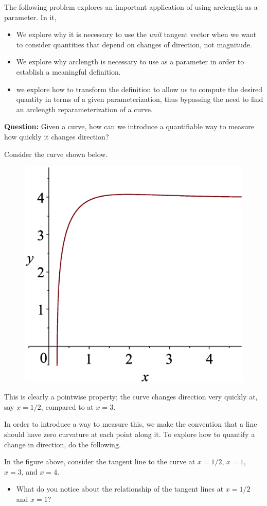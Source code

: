 \documentclass{ximera}
\author{Jim Talamo}
\begin{document}
\begin{exercise}
 
The following problem explores an important application of using arclength as a parameter.  In it, 

\begin{itemize}
\item We explore why it is necessary to use the \emph{unit} tangent vector when we want to consider quantities that depend on changes of direction, not magnitude.
\item We explore why arclength is necessary to use as a parameter in order to establish a meaningful definition. 
\item we explore how to transform the definition to allow us to compute the desired quantity in terms of a given parameterization, thus bypassing the need to find an arclength reparameterization of a curve.
\end{itemize}

\textbf{Question:} Given a curve, how can we introduce a quantifiable way to measure how quickly it changes direction?

Consider the curve shown below.  

 \begin{figure}[h!]
  \centering
  \includegraphics[width=.35 \textwidth]{curv1.eps}

\end{figure}

This is clearly a pointwise property;  the curve changes direction very quickly at, say $x=1/2$, compared to at $x=3$.

In order to introduce a way to measure this, we make the convention that a line should have zero curvature at each point along it.  To explore how to quantify a change in direction, do the following.


In the figure above, consider the tangent line to the curve at $x=1/2$, $x=1$, $x=3$, and $x=4$.  

\begin{itemize}
\item What do you notice about the relationship of the tangent lines at $x=1/2$ and $x=1$?  


\end{itemize}
\end{exercise}
\end{document}
